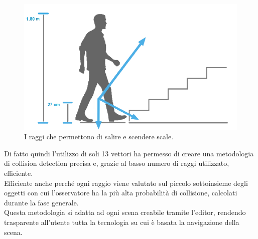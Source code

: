 \begin{figure}[htb]
 \centering
 \includegraphics[width=1\linewidth]{images/chapter_navigazione_scena/collision_gradini.jpg}\hfill
 \caption[I raggi che permetto di salire.]{I raggi che permettono di salire e scendere scale.}
 \label{fig:navigazione_scena_collision_gradini}
\end{figure}

Di fatto quindi l’utilizzo di soli 13 vettori ha permesso di creare una metodologia di collision detection precisa e, grazie al basso numero di raggi utilizzato, efficiente.
\\
Efficiente anche perché ogni raggio viene valutato sul piccolo sottoinsieme degli oggetti con cui l’osservatore ha la più alta probabilità di collisione, calcolati durante la fase generale.
\\
Questa metodologia si adatta ad ogni scena creabile tramite l’editor, rendendo trasparente all’utente tutta la tecnologia su cui è basata la navigazione della scena.

